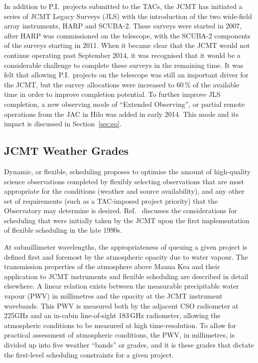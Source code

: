 \documentclass[]{spie}  %
\begin{document}
In addition to P.I.\ projects submitted to the TACs, the JCMT has
initiated a series of JCMT Legacy Surveys (JLS)\cite{2005prpl.conf.8370M,2007PASP..119..102P,2007PASP..119..842M,2007PASP..119..855W,2007arXiv0704.3202T,2009ApJ...693.1736W,2013MNRAS.432...53G}
with the introduction
of the two wide-field array instruments, HARP and SCUBA-2. These
surveys were started in 2007, after HARP was commissioned on the
telescope, with the SCUBA-2 components of the surveys starting in
2011. When it became clear that the JCMT would not continue operating
past September 2014, it was recognised that it would be a considerable
challenge to complete these surveys in the remaining time. It was felt
that allowing P.I.\ projects on the telescope was still an important
driver for the JCMT, but the survey allocations were increased to
60\,\% of the available time in order to improve completion
potential. To further improve JLS completion, a new observing mode of
``Extended Observing'', or partial remote operations from the JAC in
Hilo was added in early 2014. This mode and its impact is discussed in
Section~\ref{sec:eo}.

\subsection{JCMT Weather Grades}

Dynamic, or flexible, scheduling proposes to optimise the amount of
high-quality science observations completed by flexibly selecting
observations that are most appropriate for the conditions (weather and
source availability), and any other set of requirements (such as a
TAC-imposed project priority) that the Observatory may determine is
desired. Ref.\  discusses the considerations for
scheduling that were initially taken by the JCMT upon the first
implementation of flexible scheduling in the late 1990s.

At submillimeter wavelengths, the appropriateness of queuing a given
project is defined first and foremost by the atmospheric opacity due
to water vapour. The transmission properties of the atmosphere above
Mauna Kea and their application to JCMT instruments and flexible
scheduling are described in detail elsewhere\cite{robson2002}. A
linear relation exists between the measurable precipitable water
vapour (PWV) in millimetres and the opacity at the JCMT instrument
wavebands.\cite{2013MNRAS.430.2534D,archibald} This PWV is measured both by the adjacent CSO radiometer at
225GHz and an in-cabin line-of-sight 183\,GHz radiometer\cite{wiedner,2008SPIE.7012E.137D},
allowing the atmospheric conditions to be measured at high
time-resolution. To allow for practical assessment of atmospheric
conditions, the PWV, in millimetres, is divided up into five weather ``bands'' or
grades, and it is these grades that dictate the first-level scheduling
constraints for a given project.
\end{document}
